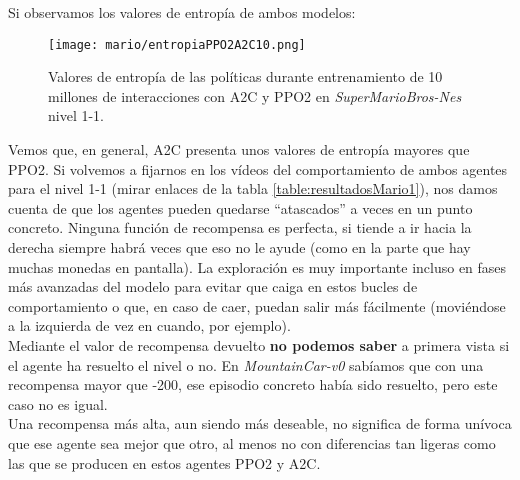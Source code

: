 \documentclass[11pt,fleqn]{book} %
\begin{document}

Si observamos los valores de entropía de ambos modelos:

\begin{figure}[H]
	\centering\texttt{[image: mario/entropiaPPO2A2C10.png]}
	\caption{Valores de entropía de las políticas durante entrenamiento de 10 millones de interacciones con A2C y PPO2 en \textit{SuperMarioBros-Nes} nivel 1-1.}
	\label{fig:entropiaSuper} %
\end{figure}

Vemos que, en general, A2C presenta unos valores de entropía mayores que PPO2. Si volvemos a fijarnos en los vídeos del comportamiento de ambos agentes para el nivel 1-1 (mirar enlaces de la tabla \ref{table:resultadosMario1}), nos damos cuenta de que los agentes pueden quedarse ``atascados'' a veces en un punto concreto. Ninguna función de recompensa es perfecta, si tiende a ir hacia la derecha siempre habrá veces que eso no le ayude (como en la parte que hay muchas monedas en pantalla). La exploración es muy importante incluso en fases más avanzadas del modelo para evitar que caiga en estos bucles de comportamiento o que, en caso de caer, puedan salir más fácilmente (moviéndose a la izquierda de vez en cuando, por ejemplo). \\

Mediante el valor de recompensa devuelto \textbf{no podemos saber} a primera vista si el agente ha resuelto el nivel o no. En \textit{MountainCar-v0} sabíamos que con una recompensa mayor que -200, ese episodio concreto había sido resuelto, pero este caso no es igual. \\

Una recompensa más alta, aun siendo más deseable, no significa de forma unívoca que ese agente sea mejor que otro, al menos no con diferencias tan ligeras como las que se producen en estos agentes PPO2 y A2C.
\end{document}
